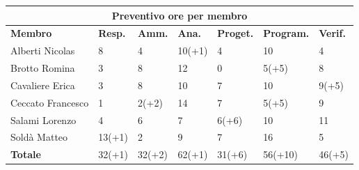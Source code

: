 \documentclass[a4paper, 12pt]{article}
\begin{document}
\begin{center}
	\begin{tabularx}{\textwidth}{|X|X|X|X|X|X|X|}
		\hline
		\multicolumn{7}{|c|}{\textbf{Preventivo ore per membro}}                                            \\
		\hline
		\hline
		\textbf{Membro}   & \textbf{Resp.}    & \textbf{Amm.}   & \textbf{Ana.} &
		\textbf{Proget.}  & \textbf{Program.} & \textbf{Verif.}                                             \\
		\hline
		Alberti Nicolas   & 8                 & 4               & 10(+1)        & 4      & 10      & 4      \\
		\hline
		Brotto Romina     & 3                 & 8               & 12            & 0      & 5(+5)   & 8      \\
		\hline
		Cavaliere Erica   & 3                 & 8               & 10            & 7      & 10      & 9(+5)  \\
		\hline
		Ceccato Francesco & 1                 & 2(+2)           & 14            & 7      & 5(+5)   & 9      \\
		\hline
		Salami Lorenzo    & 4                 & 6               & 7             & 6(+6)  & 10      & 11     \\
		\hline
		Soldà Matteo      & 13(+1)            & 2               & 9             & 7      & 16      & 5      \\
		\hline
		\hline
		\textbf{Totale}   & 32(+1)            & 32(+2)          & 62(+1)        & 31(+6) & 56(+10) & 46(+5) \\
		\hline
	\end{tabularx}\\[8pt]
	\mbox{}\\
\end{center}

\newpage
\end{document}
